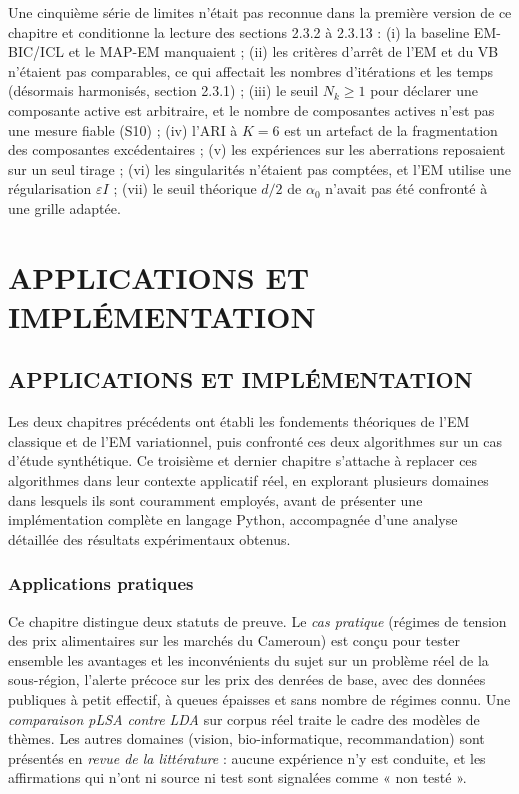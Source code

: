 Une cinquième série de limites n'était pas reconnue dans la première version de ce chapitre et conditionne la lecture des sections 2.3.2 à 2.3.13 : (i) la baseline EM-BIC/ICL et le MAP-EM manquaient ; (ii) les critères d'arrêt de l'EM et du VB n'étaient pas comparables, ce qui affectait les nombres d'itérations et les temps (désormais harmonisés, section 2.3.1) ; (iii) le seuil $N_k \geq 1$ pour déclarer une composante active est arbitraire, et le nombre de composantes actives n'est pas une mesure fiable (S10) ; (iv) l'ARI à $K = 6$ est un artefact de la fragmentation des composantes excédentaires ; (v) les expériences sur les aberrations reposaient sur un seul tirage ; (vi) les singularités n'étaient pas comptées, et l'EM utilise une régularisation $\varepsilon I$ ; (vii) le seuil théorique $d/2$ de $\alpha_0$ n'avait pas été confronté à une grille adaptée.


\part{APPLICATIONS ET IMPLÉMENTATION}

\chapter{APPLICATIONS ET IMPLÉMENTATION}
Les deux chapitres précédents ont établi les fondements théoriques de l'EM classique et de l'EM variationnel, puis confronté ces deux algorithmes sur un cas d'étude synthétique. Ce troisième et dernier chapitre s'attache à replacer ces algorithmes dans leur contexte applicatif réel, en explorant plusieurs domaines dans lesquels ils sont couramment employés, avant de présenter une implémentation complète en langage Python, accompagnée d'une analyse détaillée des résultats expérimentaux obtenus.

\section{Applications pratiques}
Ce chapitre distingue deux statuts de preuve. Le \emph{cas pratique} (régimes de tension des prix alimentaires sur les marchés du Cameroun) est conçu pour tester ensemble les avantages et les inconvénients du sujet sur un problème réel de la sous-région, l'alerte précoce sur les prix des denrées de base, avec des données publiques à petit effectif, à queues épaisses et sans nombre de régimes connu. Une \emph{comparaison pLSA contre LDA} sur corpus réel traite le cadre des modèles de thèmes. Les autres domaines (vision, bio-informatique, recommandation) sont présentés en \emph{revue de la littérature} : aucune expérience n'y est conduite, et les affirmations qui n'ont ni source ni test sont signalées comme « non testé ».

